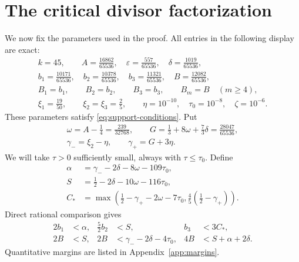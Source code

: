 \documentclass[11pt,reqno]{amsart}
\theoremstyle{definition}
\theoremstyle{remark}
\numberwithin{equation}{section}
\newcommand{\tmax}{\tau_0}
\newcommand{\gmin}{\gamma_-}
\newcommand{\gmax}{\gamma_+}
\begin{document}
\section{The critical divisor factorization}\label{sec:factorization}
We now fix the parameters used in the proof. All entries in the following
display are exact:
\begin{equation}\label{eq:parameters}
\begin{gathered}
 k=45,\qquad
 A=\frac{16862}{65536},\quad
 \varepsilon=\frac{557}{65536},\quad
 \delta=\frac{1019}{65536},\\
 b_1=\frac{10171}{65536},\quad
 b_2=\frac{10378}{65536},\quad
 b_3=\frac{11321}{65536},\quad
 B=\frac{12082}{65536},\\
 B_1=b_1,\qquad B_2=b_2,\qquad B_3=b_3,\qquad B_m=B\quad(m\ge4),\\
 \xi_1=\frac{19}{50},\qquad \xi_2=\xi_3=\frac25,\qquad
 \eta=10^{-10},\quad \tmax=10^{-8},\quad \zeta=10^{-6}.
\end{gathered}
\end{equation}
These parameters satisfy \eqref{eq:support-conditions}. Put
\begin{equation}\label{eq:gamma-parameters}
\begin{gathered}
 \omega=A-\frac14=\frac{239}{32768},\qquad
 G=\frac13+8\omega+\frac73\delta=\frac{28047}{65536},\\
 \gmin=\xi_2-\eta,\qquad \gmax=G+3\eta.
\end{gathered}
\end{equation}
We will take $\tau>0$ sufficiently small, always with $\tau\le\tmax$.
Define
\begin{align}
 \alpha&=\gmin-2\delta-8\omega-109\tmax,\label{eq:alpha}\\
 S&=\frac12-2\delta-10\omega-116\tmax,\label{eq:S}\\
 C_*&=\max\left(\frac12-\gmax-2\omega-7\tmax,
                    \frac45\left(\frac12-\gmax\right)\right).
                    \label{eq:Cstar}
\end{align}
Direct rational comparison gives
\begin{align}
 2b_1&<\alpha,& \frac52b_2&<S,& b_3&<3C_*,\label{eq:uniform-one}\\
 2B&<S,& 2B&<\gmin-2\delta-4\tmax,&
 4B&<S+\alpha+2\delta.\label{eq:uniform-two}
\end{align}
Quantitative margins are listed in Appendix~\ref{app:margins}.
\end{document}

